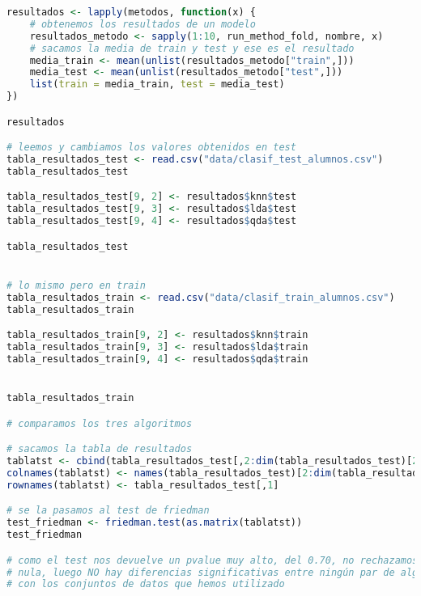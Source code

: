 \begin{lstlisting}[language=R]
resultados <- lapply(metodos, function(x) {
	# obtenemos los resultados de un modelo
	resultados_metodo <- sapply(1:10, run_method_fold, nombre, x)
	# sacamos la media de train y test y ese es el resultado
	media_train <- mean(unlist(resultados_metodo["train",]))
	media_test <- mean(unlist(resultados_metodo["test",]))
	list(train = media_train, test = media_test)
})

resultados

# leemos y cambiamos los valores obtenidos en test
tabla_resultados_test <- read.csv("data/clasif_test_alumnos.csv")
tabla_resultados_test

tabla_resultados_test[9, 2] <- resultados$knn$test
tabla_resultados_test[9, 3] <- resultados$lda$test
tabla_resultados_test[9, 4] <- resultados$qda$test

tabla_resultados_test


# lo mismo pero en train
tabla_resultados_train <- read.csv("data/clasif_train_alumnos.csv")
tabla_resultados_train

tabla_resultados_train[9, 2] <- resultados$knn$train
tabla_resultados_train[9, 3] <- resultados$lda$train
tabla_resultados_train[9, 4] <- resultados$qda$train


tabla_resultados_train

# comparamos los tres algoritmos

# sacamos la tabla de resultados
tablatst <- cbind(tabla_resultados_test[,2:dim(tabla_resultados_test)[2]])
colnames(tablatst) <- names(tabla_resultados_test)[2:dim(tabla_resultados_test)[2]]
rownames(tablatst) <- tabla_resultados_test[,1]

# se la pasamos al test de friedman
test_friedman <- friedman.test(as.matrix(tablatst))
test_friedman

# como el test nos devuelve un pvalue muy alto, del 0.70, no rechazamos la hipotesis
# nula, luego NO hay diferencias significativas entre ningún par de algoritmos
# con los conjuntos de datos que hemos utilizado
\end{lstlisting}
